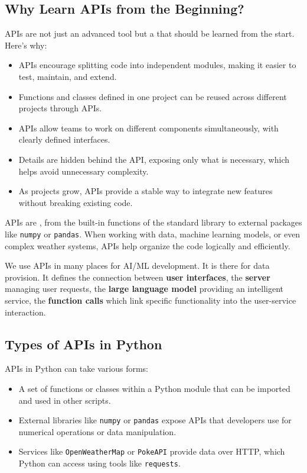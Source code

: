 \subsection{Why Learn APIs from the Beginning?}

APIs are not just an advanced tool but a  that should be learned from the start. Here’s why:
\begin{itemize}
    \item {} APIs encourage splitting code into independent modules, making it easier to test, maintain, and extend.
    \item {} Functions and classes defined in one project can be reused across different projects through APIs.
    \item {} APIs allow teams to work on different components simultaneously, with clearly defined interfaces.
    \item {} Details are hidden behind the API, exposing only what is necessary, which helps avoid unnecessary complexity.
    \item {} As projects grow, APIs provide a stable way to integrate new features without breaking existing code.
\end{itemize}

APIs are , from the built-in functions of the standard library to external packages like \texttt{numpy} or \texttt{pandas}. When working with data, machine learning models, or even complex weather systems, APIs help organize the code logically and efficiently.

We use APIs in many places for AI/ML development. It is there for data provision. It defines the connection between {\bf user interfaces}, the {\bf server} managing user requests, the {\bf large language model} providing an intelligent service, the {\bf function calls} which link specific functionality into the user-service interaction. 

%
\subsection{Types of APIs in Python}

APIs in Python can take various forms:
\begin{itemize}
    \item {} A set of functions or classes within a Python module that can be imported and used in other scripts.
    \item {} External libraries like \texttt{numpy} or \texttt{pandas} expose APIs that developers use for numerical operations or data manipulation.
    \item {} Services like \texttt{OpenWeatherMap} or \texttt{PokeAPI} provide data over HTTP, which Python can access using tools like \texttt{requests}.
\end{itemize}

